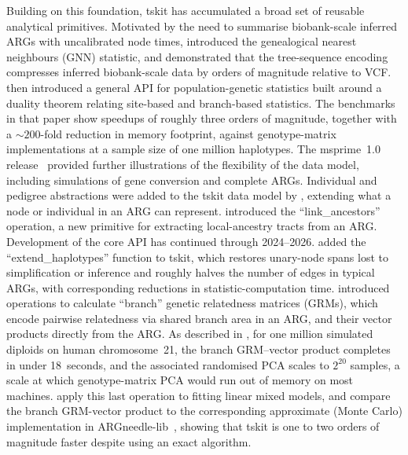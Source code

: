 \documentclass{article}
\begin{document}
Building on this foundation, tskit has accumulated a broad set of
reusable analytical primitives.
Motivated by the need to summarise biobank-scale inferred ARGs with
uncalibrated node times, \citet{kelleher2019inferring} introduced the
genealogical nearest neighbours (GNN) statistic, and demonstrated that
the tree-sequence encoding compresses inferred biobank-scale data by
orders of magnitude relative to VCF.
\citet{ralph2020efficiently} then introduced a general API for
population-genetic statistics built around a duality theorem relating
site-based and branch-based statistics. The benchmarks in that paper
show speedups of roughly three orders of magnitude, together with a
$\sim 200$-fold reduction in memory footprint, against genotype-matrix
implementations at a sample size of one million haplotypes.
The msprime~1.0 release~\citep{baumdicker2022efficient} provided
further illustrations of the flexibility of the data model, including
simulations of gene conversion and complete ARGs.
Individual and pedigree abstractions were added to the tskit data
model by \citet{andersontrocme2023genes}, extending what a node or
individual in an ARG can represent.
\citet{tsambos2023link} introduced the ``link\_ancestors'' operation,
a new primitive for extracting local-ancestry tracts from an ARG.
Development of the core API has continued through 2024--2026.
\citet{fritze2026forest} added the ``extend\_haplotypes'' function to
tskit, which restores unary-node spans lost to simplification or
inference and roughly halves the number of edges in typical ARGs, with
corresponding reductions in statistic-computation time. \citet{lehmann2026on}
introduced operations to calculate ``branch'' genetic relatedness matrices
(GRMs), which encode pairwise relatedness via shared branch area in an ARG, and their
vector products directly from the ARG. As described in \citet{lehmann2026on},
for one million simulated diploids on human chromosome~21, the
branch GRM--vector product completes in under 18~seconds, and the associated
randomised PCA scales to $2^{20}$ samples, a scale at which genotype-matrix PCA
would run out of memory on most machines.
\citet{lee2026genetic} apply this last operation to fitting linear mixed models,
and compare the branch GRM-vector product to the corresponding approximate (Monte Carlo)
implementation in ARGneedle-lib~\citep{zhang2023biobank}, showing that tskit is
one to two orders of magnitude faster despite using an exact algorithm.
\end{document}
